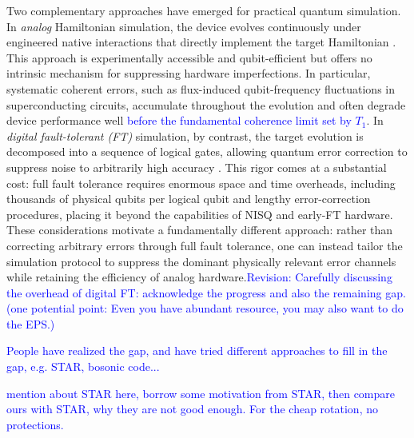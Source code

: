 \documentclass[%
10pt,tightenlines,
superscriptaddress,
 amsmath,amssymb,
 aps,
pra,
]{revtex4-2}
\newcommand{\sy}[1]{\textcolor{blue}{#1}}
\begin{document}
Two complementary approaches have emerged for practical quantum simulation. In \emph{analog} Hamiltonian simulation, the device evolves continuously under engineered native interactions that directly implement the target Hamiltonian \cite{georgescu2014quantum,daley2022practical}. This approach is experimentally accessible and qubit-efficient but offers no intrinsic mechanism for suppressing hardware imperfections. In particular, systematic coherent errors, such as flux-induced qubit-frequency fluctuations in superconducting circuits, accumulate throughout the evolution and often degrade device performance well \sy{before the fundamental coherence limit set by $T_1$}. In \emph{digital fault-tolerant (FT)} simulation, by contrast, the target evolution is decomposed into a sequence of logical gates, allowing quantum error correction to suppress noise to arbitrarily high accuracy \cite{lloyd1996universal,daniel-FT}. This rigor comes at a substantial cost: full fault tolerance requires enormous space and time overheads, including thousands of physical qubits per logical qubit and lengthy error-correction procedures, placing it beyond the capabilities of NISQ and early-FT hardware. These considerations motivate a fundamentally different approach: rather than correcting arbitrary errors through full fault tolerance, one can instead tailor the simulation protocol to suppress the dominant physically relevant error channels while retaining the efficiency of analog hardware.\sy{Revision: Carefully discussing the overhead of digital FT: acknowledge the progress and also the remaining gap. (one potential point: Even you have abundant resource, you may also want to do the EPS.)} 

\sy{People have realized the gap, and have tried different approaches to fill in the gap, e.g. STAR, bosonic code...}

\sy{mention about STAR here, borrow some motivation from STAR, then compare ours with STAR, why they are not good enough. For the cheap rotation, no protections.}
\end{document}
